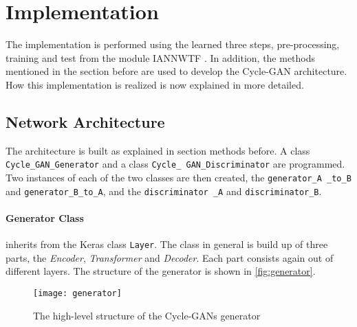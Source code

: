 \documentclass[fleqn,10pt]{SelfArx} %
\begin{document}
\section{Implementation}
The implementation is performed using the learned three steps, pre-processing, training and test from the module \ac{IANNWTF} \cite{implementingANsCourseware02, implementingANsCourseware03}. In addition, the methods mentioned in the section before are used to develop the Cycle-\ac{GAN} architecture. How this implementation is realized is now explained in more detailed.

\subsection{Network Architecture}
The architecture is built as explained in section methods before. A class \texttt{Cycle\_GAN\_Generator} and a class \texttt{Cycle\_ GAN\_Discriminator} are programmed. Two instances of each of the two classes are then created, the \texttt{generator\_A \_to\_B} and \texttt{generator\_B\_to\_A}, and the \texttt{discriminator \_A} and \texttt{discriminator\_B}.

\paragraph{Generator Class} inherits from the Keras class \texttt{Layer}. The class in general is build up of three parts, the \textit{Encoder}, \textit{Transformer} and \textit{Decoder}. Each part consists again out of different layers. The structure of the generator is shown in \autoref{fig:generator}. \cite{Introduction-to-Cycle-GANs}

\begin{figure*}[htb] 
	\centering 
	\texttt{[image: generator]}
	\caption{The high-level structure of the Cycle-\ac{GAN}s generator \cite{Introduction-to-Cycle-GANs}}
	\label{fig:generator}
\end{figure*}
\end{document}
